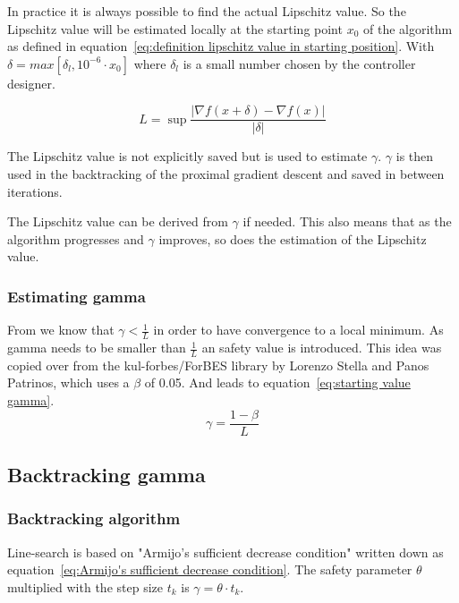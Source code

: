 			In practice it is always possible to find the actual Lipschitz value. So the Lipschitz value will be estimated locally at the starting point $x_0$ of the algorithm as defined in equation~\ref{eq:definition lipschitz value in starting position}. With $\delta=max[\delta_l,10^{-6} \cdot x_0]$ where $\delta_l$ is a small number chosen by the controller designer.
			
			\begin{equation}
			L = \underset{}{\sup} \frac{|\nabla f(x+\delta)-\nabla f(x)|}{|\delta|}
			\label{eq:definition lipschitz value in starting position}
			\end{equation}
			
			The Lipschitz value is not explicitly saved but is used to estimate $\gamma$. $\gamma$ is then used in the backtracking of the proximal gradient descent and saved in between iterations. 
			
			The Lipschitz value can be derived from $\gamma$ if needed. This also means that as the algorithm progresses and $\gamma$ improves, so does the estimation of the Lipschitz value. 
		
		\subsubsection{Estimating gamma}	
			From \cite{LorenzoStella2017} we know that $\gamma<\frac{1}{L}$ in order to have convergence to a local minimum. As gamma needs to be smaller than $\frac{1}{L}$ an safety value is introduced. This idea was copied over from the kul-forbes/ForBES library by Lorenzo Stella and Panos Patrinos, which uses a $\beta$ of 0.05. And leads to equation~\ref{eq:starting value gamma}.
			\begin{equation}
			\gamma = \frac{1-\beta}{L}
			\label{eq:starting value gamma}
			\end{equation}		
	
	\subsection{Backtracking gamma}
		\subsubsection{Backtracking algorithm}
			Line-search is based on "Armijo's sufficient decrease condition" written down as equation~\ref{eq:Armijo's sufficient decrease condition}. The safety parameter $\theta$ multiplied with the step size $t_k$ is $\gamma=\theta \cdot t_k$. 
			
